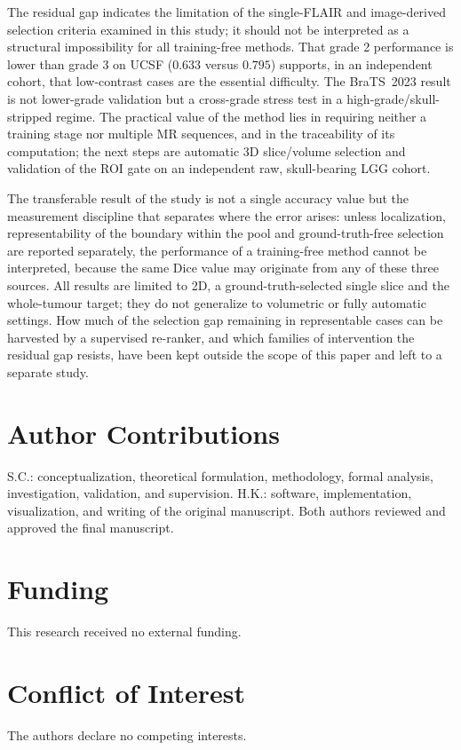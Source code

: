 \documentclass[11pt,a4paper]{article}
\begin{document}
The residual gap indicates the limitation of the single-FLAIR and image-derived
selection criteria examined in this study; it should not be interpreted as a
structural impossibility for all training-free methods. That grade 2 performance is
lower than grade 3 on UCSF ($0.633$ versus $0.795$) supports, in an independent
cohort, that low-contrast cases are the essential difficulty. The BraTS~2023 result
is not lower-grade validation but a cross-grade stress test in a
high-grade/skull-stripped regime. The practical value of the method lies in
requiring neither a training stage nor multiple MR sequences, and in the
traceability of its computation; the next steps are automatic 3D slice/volume
selection and validation of the ROI gate on an independent raw, skull-bearing LGG
cohort.

The transferable result of the study is not a single accuracy value but the
measurement discipline that separates where the error arises: unless localization,
representability of the boundary within the pool and ground-truth-free selection
are reported separately, the performance of a training-free method cannot be
interpreted, because the same Dice value may originate from any of these three
sources. All results are limited to 2D, a ground-truth-selected single slice and
the whole-tumour target; they do not generalize to volumetric or fully automatic
settings. How much of the selection gap remaining in representable cases can be
harvested by a supervised re-ranker, and which families of intervention the residual
gap resists, have been kept outside the scope of this paper and left to a separate
study.

\fi

\section*{Author Contributions}
S.C.: conceptualization, theoretical formulation, methodology, formal analysis,
investigation, validation, and supervision. H.K.: software, implementation,
visualization, and writing of the original manuscript. Both authors reviewed and
approved the final manuscript.

\section*{Funding}
This research received no external funding.

\section*{Conflict of Interest}
The authors declare no competing interests.
\end{document}
